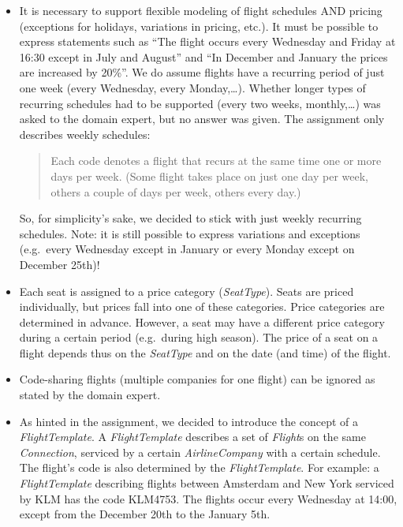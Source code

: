 \documentclass[a4paper]{article}
\newcommand{\field}[1]{\emph{#1}}
\begin{document}
\begin{itemize}

\item It is necessary to support flexible modeling of flight schedules AND pricing (exceptions for holidays, variations in pricing, etc.).
It must be possible to express statements such as ``The flight occurs every Wednesday and Friday at 16:30 except in July and August'' and ``In December and January the prices are increased by 20\%''.
We do assume flights have a recurring period of just one week (every Wednesday, every Monday,\ldots).
Whether longer types of recurring schedules had to be supported (every two weeks, monthly,\ldots) was asked to the domain expert, but no answer was given.
The assignment only describes weekly schedules:

\begin{quote}
Each code denotes a flight that recurs at the same time one or more days per week.
(Some flight takes place on just one day per week, others a couple of days per week, others every day.)
\end{quote}

So, for simplicity's sake, we decided to stick with just weekly recurring schedules.
Note: it is still possible to express variations and exceptions (e.g.\ every Wednesday except in January or every Monday except on December 25th)!

\item Each seat is assigned to a price category (\field{SeatType}).
Seats are priced individually, but prices fall into one of these categories.
Price categories are determined in advance.
However, a seat may have a different price category during a certain period (e.g.\ during high season).
The price of a seat on a flight depends thus on the \field{SeatType} and on the date (and time) of the flight.

\item Code-sharing flights (multiple companies for one flight) can be ignored as stated by the domain expert.

\item As hinted in the assignment, we decided to introduce the concept of a \field{FlightTemplate}.
A \field{FlightTemplate} describes a set of \field{Flight}s on the same \field{Connection}, serviced by a certain \field{AirlineCompany} with a certain schedule.
The flight's code is also determined by the \field{FlightTemplate}.
For example: a \field{FlightTemplate} describing flights between Amsterdam and New York serviced by KLM has the code KLM4753.
The flights occur every Wednesday at 14:00, except from the December 20th to the January 5th.


\end{itemize}
\end{document}
